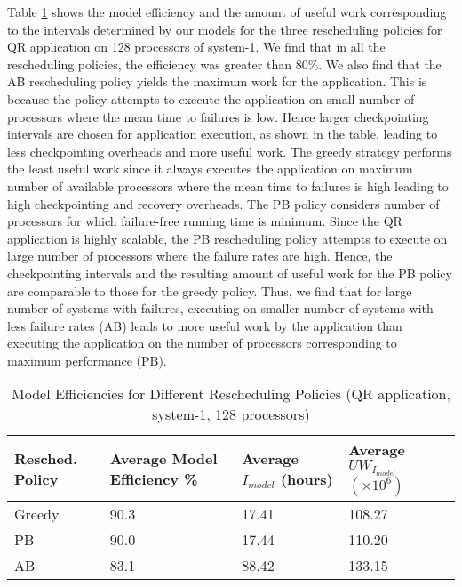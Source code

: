 \documentclass[conference,10pt]{IEEEtran}
\begin{document}
Table \ref{different-rp} shows the model efficiency and the amount of
useful work corresponding to the intervals determined by our models
for the three rescheduling policies for QR application on 128
processors of system-1. We find that in all the rescheduling policies,
the efficiency was greater than 80\%. We also find that the AB
rescheduling policy yields the maximum work for the application. This
is because the policy attempts to execute the application on small
number of processors where the mean time to failures is low. Hence
larger checkpointing intervals are chosen for application execution,
as shown in the table, leading to less checkpointing overheads and
more useful work. The greedy strategy performs the least useful work
since it always executes the application on maximum number of
available processors where the mean time to failures is high leading
to high checkpointing and recovery overheads. The PB policy considers
number of processors for which failure-free running time is
minimum. Since the QR application is highly scalable, the PB
rescheduling policy attempts to execute on large number of processors
where the failure rates are high. Hence, the checkpointing intervals
and the resulting amount of useful work for the PB policy are
comparable to those for the greedy policy. Thus, we find that for
large number of systems with failures, executing on smaller number of
systems with less failure rates (AB) leads to more useful work by the
application than executing the application on the number of processors
corresponding to maximum performance (PB).

\begin{table}
\centering
\caption{Model Efficiencies for Different Rescheduling Policies (QR
  application, system-1, 128 processors)}
\begin{tabular}{|p{0.6in}|p{0.7in}|p{0.55in}|p{0.55in}|}
\hline\hline
Resched. Policy & Average Model Efficiency
\% & Average $I_{model}$ (hours) & Average $UW_{I_{model}}$  $(\times
10^6)$ 
\\ \hline\hline
Greedy & 90.3   & 17.41 & 108.27 \\ \hline
PB        & 90.0 & 17.44 & 110.20 \\ \hline
AB        & 83.1 & 88.42 & 133.15 \\ \hline
\hline
\end{tabular}
\label{different-rp}
\end{table}
\end{document}
